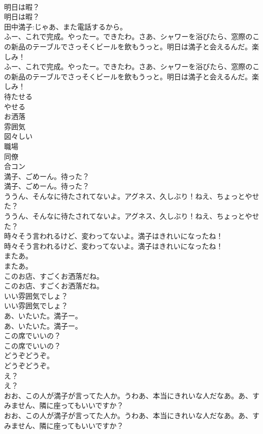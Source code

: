 \documentclass[8pt]{extreport}
\begin{document}
\begin{CJK}{UTF8}{min}
\\	明日は暇？	
\\	明日は暇？ 
\\	田中満子:じゃあ、また電話するから。	
\\	ふー、これで完成。やったー。できたわ。さあ、シャワーを浴びたら、窓際のこの新品のテーブルでさっそくビールを飲もうっと。明日は満子と会えるんだ。楽しみ！	
\\	ふー、これで完成。やったー。できたわ。さあ、シャワーを浴びたら、窓際のこの新品のテーブルでさっそくビールを飲もうっと。明日は満子と会えるんだ。楽しみ！ 
\\	待たせる
\\	やせる
\\	お洒落
\\	雰囲気
\\	図々しい
\\	職場
\\	同僚
\\	合コン
\\	満子、ごめーん。待った？	
\\	満子、ごめーん。待った？ 
\\	ううん、そんなに待たされてないよ。アグネス、久しぶり！ねえ、ちょっとやせた？	
\\	ううん、そんなに待たされてないよ。アグネス、久しぶり！ねえ、ちょっとやせた？ 
\\	時々そう言われるけど、変わってないよ。満子はきれいになったね！	
\\	時々そう言われるけど、変わってないよ。満子はきれいになったね！ 
\\	またあ。	
\\	またあ。 
\\	このお店、すごくお洒落だね。	
\\	このお店、すごくお洒落だね。 
\\	いい雰囲気でしょ？	
\\	いい雰囲気でしょ？ 
\\	あ、いたいた。満子ー。	
\\	あ、いたいた。満子ー。 
\\	この席でいいの？	
\\	この席でいいの？ 
\\	どうぞどうぞ。	
\\	どうぞどうぞ。 
\\	え？	
\\	え？ 
\\	おお、この人が満子が言ってた人か。うわあ、本当にきれいな人だなあ。あ、すみません、隣に座ってもいいですか？	
\\	おお、この人が満子が言ってた人か。うわあ、本当にきれいな人だなあ。あ、すみません、隣に座ってもいいですか？ 

\end{CJK}
\end{document}

